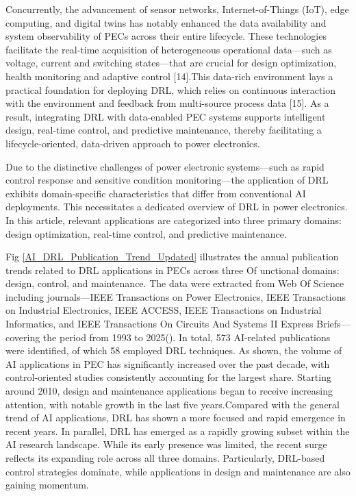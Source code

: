 \documentclass[lettersize,journal]{IEEEtran}
\begin{document}
Concurrently, the advancement of sensor networks, Internet-of-Things (IoT), edge computing, and digital twins \cite{9841555, 9139976,11005593} has notably enhanced the data availability and system observability of PECs across their entire lifecycle. These technologies facilitate the real-time acquisition of heterogeneous operational data—such as voltage, current and switching states—that are crucial for design optimization, health monitoring and adaptive control [14].This data-rich environment lays a practical foundation for deploying DRL, which relies on continuous interaction with the environment and feedback from multi-source process data [15]. As a result, integrating DRL with data-enabled PEC systems supports intelligent design, real-time control, and predictive maintenance, thereby facilitating a lifecycle-oriented, data-driven approach to power electronics.

Due to the distinctive challenges of power electronic systems—such as rapid control response and sensitive condition monitoring—the application of DRL exhibits domain-specific characteristics that differ from conventional AI deployments. This necessitates a dedicated overview of DRL in power electronics. In this article, relevant applications are categorized into three primary domains: design optimization, real-time control, and predictive maintenance.

Fig \ref{AI_DRL_Publication_Trend_Updated} illustrates the annual publication trends related to DRL applications in PECs across three Of unctional domains: design, control, and maintenance. The data were extracted from Web Of Science including journals—IEEE Transactions on Power Electronics, IEEE Transactions on Industrial Electronics, IEEE ACCESS, IEEE Transactions on Industrial Informatics, and IEEE Transactions On Circuits And Systems II Express Briefs—covering the period from 1993 to 2025(). In total, 573 AI-related publications were identified, of which 58 employed DRL techniques. As shown, the volume of AI applications in PEC has significantly increased over the past decade, with control-oriented studies consistently accounting for the largest share. Starting around 2010, design and maintenance applications began to receive increasing attention, with notable growth in the last five years.Compared with the general trend of AI applications, DRL has shown a more focused and rapid emergence in recent years. In parallel, DRL has emerged as a rapidly growing subset within the AI research landscape. While its early presence was limited, the recent surge reflects its expanding role across all three domains. Particularly, DRL-based control strategies dominate, while applications in design and maintenance are also gaining momentum.
\end{document}
